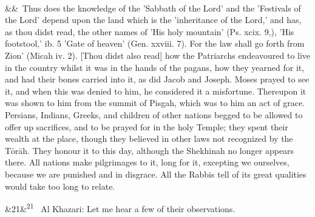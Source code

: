 \documentclass[12pt]{article}
\newcommand{\para}[1][]{\par\noindent\ifx&#1&\else\textsuperscript{\footnotesize #1}~\fi}
\begin{document}
\para Thus does the knowledge of the 'Sabbath of the Lord' and the 'Festivals of the Lord' depend upon the land which is the 'inheritance of the Lord,' and has, as thou didst read, the other names of 'His holy mountain' (Ps. xcix. 9,), 'His footstool,' ib. 5 'Gate of heaven' (Gen. xxviii. 7). For the law shall go forth from Zion' (Micah iv. 2). [Thou didst also read] how the Patriarchs endeavoured to live in the country whilst it was in the hands of the pagans, how they yearned for it, and had their bones carried into it, as did Jacob and Joseph. Moses prayed to see it, and when this was denied to him, he considered it a misfortune. Thereupon it was shown to him from the summit of Pisgah, which was to him an act of grace. Persians, Indians, Greeks, and children of other nations begged to be allowed to offer up sacrifices, and to be prayed for in the holy Temple; they spent their wealth at the place, though they believed in other laws not recognized by the Tōrāh. They honour it to this day, although the Shekhinah no longer appears there. All nations make pilgrimages to it, long for it, excepting we ourselves, because we are punished and in disgrace. All the Rabbis tell of its great qualities would take too long to relate.

\para[21] Al Khazari: Let me hear a few of their observations.
\end{document}
